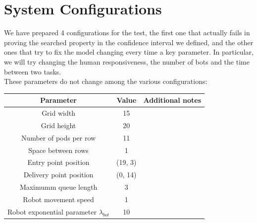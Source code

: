 \documentclass[10pt,a4paper]{article}
\begin{document}
	\section{System Configurations}
		We have prepared 4 configurations for the test, the first one that actually fails in proving the searched property in the confidence interval we defined, and the other ones that try to fix the model changing every time a key parameter. In particular, we will try changing the human responsiveness, the number of bots and the time between two tasks.\\
		These parameters do not change among the various configurations:
		\begin{center}
				\begin{tabular}{ |c|c|c|}
					\hline
					Parameter & Value & Additional notes\\
					\hline
					\hline
					Grid width & 15 &\\
					\hline
					Grid height & 20 &\\
					\hline
					Number of pods per row & 11 &\\
					\hline
					Space between rows & 1 &\\
					\hline
					Entry point position & (19, 3) &\\
					\hline
					Delivery point position & (0, 14) &\\
					\hline
					Maximumm queue length & 3 &\\
					\hline
					Robot movement speed & 1 &\\
					\hline
					Robot exponential parameter $\lambda_{bot}$ & 10 &\\
					\hline
				\end{tabular}
			\end{center}
\end{document}
